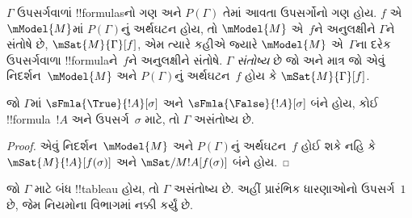 \documentclass[../../../include/open-logic-section]{subfiles}
\begin{document}
\begin{defn}
  $\Gamma$ ઉપસર્ગવાળાં !!{formula}sનો ગણ અને $P(\Gamma)$ તેમાં
  આવતા ઉપસર્ગોનો ગણ હોય. $f$ એ~$\mModel{M}$માં
  $P(\Gamma)$નું અર્થઘટન હોય, તો $\mModel{M}$ એ~$f$ને અનુલક્ષીને
  $\Gamma$ને સંતોષે છે, $\mSat{M}{\Gamma}[f]$, એમ ત્યારે કહીએ
  જ્યારે $\mModel{M}$ એ~$\Gamma$ના દરેક ઉપસર્ગવાળા
  !!{formula}ને~$f$ને અનુલક્ષીને સંતોષે. $\Gamma$
  \emph{સંતોષ્ય} છે જો અને માત્ર જો એવું નિદર્શન~$\mModel{M}$
  અને $P(\Gamma)$નું અર્થઘટન~$f$ હોય કે
  $\mSat{M}{\Gamma}[f]$.
\end{defn}

\begin{prop}
  જો $\Gamma$માં $\sFmla{\True}{!A}[\sigma]$ અને
  $\sFmla{\False}{!A}[\sigma]$ બંને હોય, કોઈ !!{formula}~$!A$
  અને ઉપસર્ગ~$\sigma$ માટે, તો $\Gamma$ અસંતોષ્ય છે.
\end{prop}

\begin{proof}
  એવું નિદર્શન~$\mModel{M}$ અને $P(\Gamma)$નું અર્થઘટન~$f$
  હોઈ શકે નહિ કે $\mSat{M}{!A}[f(\sigma)]$ અને
  $\mSat/{M}{!A}[f(\sigma)]$ બંને હોય.
\end{proof}

\begin{thm}[યથાર્થતા]
  જો $\Gamma$ માટે બંધ !!{tableau} હોય, તો $\Gamma$ અસંતોષ્ય છે.
  અહીં પ્રારંભિક ધારણાઓનો ઉપસર્ગ~$1$ છે, જેમ
  નિયમોના વિભાગમાં નક્કી કર્યું છે.
\end{thm}
\end{document}
